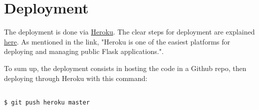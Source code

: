 \section{Deployment}

The deployment is done via \href{https://www.heroku.com/}{Heroku}. The clear steps for deployment are explained \href{https://dash.plotly.com/deployment}{here}. As mentioned in the link, "Heroku is one of the easiest platforms for deploying and managing public Flask applications.".

To sum up, the deployment consists in hosting the code in a Github repo, then deploying through Heroku with this command:

\lstset{language=bash}
\lstset{frame=lines}
\lstset{basicstyle=\footnotesize}
\begin{lstlisting}

$ git push heroku master

\end{lstlisting}


\vspace{5mm}
